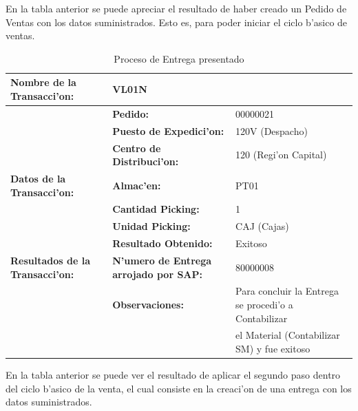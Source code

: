 	En la tabla anterior se puede apreciar el resultado de haber creado un Pedido de Ventas con los datos suministrados. Esto es, para poder iniciar el ciclo b'asico de ventas.
\begin{table}[h!]
\footnotesize
\scalebox{0.8} {
\begin{tabular}{l l l}
\toprule
\textbf{Nombre de la Transacci'on:} & VL01N &\\
\midrule
                 & \textbf{Pedido:} & 00000021 \\
                 \cmidrule{2-3}
                 & \textbf{Puesto de Expedici'on:} & 120V (Despacho) \\
                 \cmidrule{2-3}
                 & \textbf{Centro de Distribuci'on:} & 120 (Regi'on Capital) \\
                 \cmidrule{2-3}
\textbf{Datos de la Transacci'on:}                  & \textbf{Almac'en:}                   &   PT01 \\
                 \cmidrule{2-3}
                 & \textbf{Cantidad Picking:}            & 1 \\
                 \cmidrule{2-3}
                 & \textbf{Unidad Picking:}              & CAJ (Cajas) \\
                 \midrule
                 & \textbf{Resultado Obtenido:} & Exitoso \\
                 \cmidrule{2-3}
\textbf{Resultados de la Transacci'on:}    & \textbf{N'umero de Entrega arrojado por SAP:} & 80000008 \\
                 \cmidrule{2-3}
                 & \textbf{Observaciones:} &  Para concluir la Entrega se procedi'o a Contabilizar \\
                 &                                      & el Material (Contabilizar SM) y fue exitoso\\
                 \bottomrule
\end{tabular}}
\caption{Proceso de Entrega presentado}
\label{tb:entrega}
\end{table}
	En la tabla anterior se puede ver el resultado de aplicar el segundo paso dentro del ciclo b'asico de la venta, el cual consiste en la creaci'on de una entrega con los datos suministrados. 
